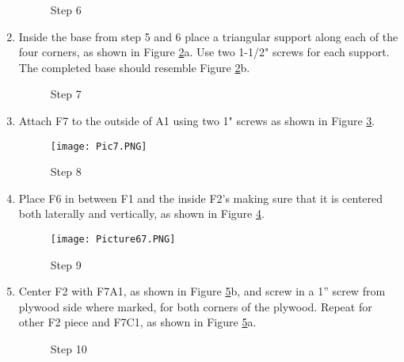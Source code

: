 \documentclass[11pt,english]{article}
\begin{document}
\begin{enumerate}
 
\begin{figure}[ht!]%
\centering
    \qquad
    \caption{Step 6}%
    \label{fig:step 6}%
\end{figure}


\item Inside the base from step 5 and 6 place a triangular support along each of the four corners, as shown in Figure \ref{fig:cornerpieces}a. Use two 1-1/2" screws for each support. The completed base should resemble Figure \ref{fig:cornerpieces}b.   


\begin{figure}[ht!]%
\centering
    \qquad
    \caption{Step 7}%
    \label{fig:cornerpieces}%
\end{figure}

\item Attach F7 to the outside of A1 using two 1" screws as shown in Figure \ref{fig:step 8}.  

\begin{figure}[ht!]
\centering
\texttt{[image: Pic7.PNG]}
\caption{Step 8}
\label{fig:step 8}
\end{figure}


\item Place F6 in between F1 and the inside F2’s making sure that it is centered both laterally and vertically, as shown in Figure \ref{fig:step 9}.
\begin{figure}[ht!]
\centering
\texttt{[image: Picture67.PNG]}
\caption{Step 9}
\label{fig:step 9}
\end{figure}
\newpage
\item Center F2 with F7A1, as shown in Figure \ref{fig:step 10}b, and screw in a 1” screw from plywood side where marked, for both corners of the plywood. Repeat for other F2 piece and F7C1, as shown in Figure \ref{fig:step 10}a. 

\begin{figure}[ht!]%
\centering
    \qquad
    \caption{Step 10}%
    \label{fig:step 10}%
\end{figure}


\end{enumerate}
\end{document}
